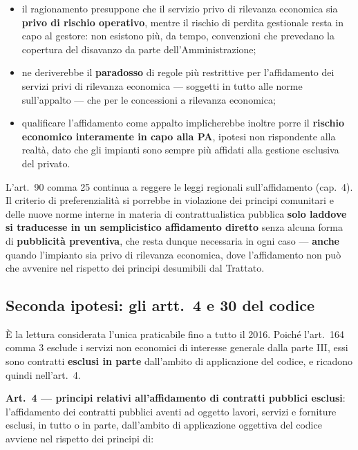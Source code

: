 \begin{itemize}
  \item il ragionamento presuppone che il servizio privo di rilevanza economica sia \textbf{privo
    di rischio operativo}, mentre il rischio di perdita gestionale resta in capo al gestore: non
    esistono più, da tempo, convenzioni che prevedano la copertura del disavanzo da parte
    dell'Amministrazione;
  \item ne deriverebbe il \textbf{paradosso} di regole più restrittive per l'affidamento dei
    servizi privi di rilevanza economica --- soggetti in tutto alle norme sull'appalto --- che per
    le concessioni a rilevanza economica;
  \item qualificare l'affidamento come appalto implicherebbe inoltre porre il \textbf{rischio
    economico interamente in capo alla PA}, ipotesi non rispondente alla realtà, dato che gli
    impianti sono sempre più affidati alla gestione esclusiva del privato.
\end{itemize}


L'art.\ 90 comma 25 continua a reggere le leggi regionali sull'affidamento (cap.~4). Il criterio di
preferenzialità si porrebbe in violazione dei principi comunitari e delle nuove norme interne in
materia di contrattualistica pubblica \textbf{solo laddove si traducesse in un semplicistico
affidamento diretto} senza alcuna forma di \textbf{pubblicità preventiva}, che resta dunque
necessaria in ogni caso --- \textbf{anche} quando l'impianto sia privo di rilevanza economica, dove
l'affidamento non può che avvenire nel rispetto dei principi desumibili dal Trattato.

\subsection{Seconda ipotesi: gli artt.\ 4 e 30 del codice}

È la lettura considerata l'unica praticabile fino a tutto il 2016. Poiché l'art.\ 164 comma 3
esclude i servizi non economici di interesse generale dalla parte III, essi sono contratti
\textbf{esclusi in parte} dall'ambito di applicazione del codice, e ricadono quindi nell'art.\ 4.

\textbf{Art.\ 4 --- principi relativi all'affidamento di contratti pubblici esclusi}:
l'affidamento dei contratti pubblici aventi ad oggetto lavori, servizi e forniture esclusi, in
tutto o in parte, dall'ambito di applicazione oggettiva del codice avviene nel rispetto dei
principi di:

